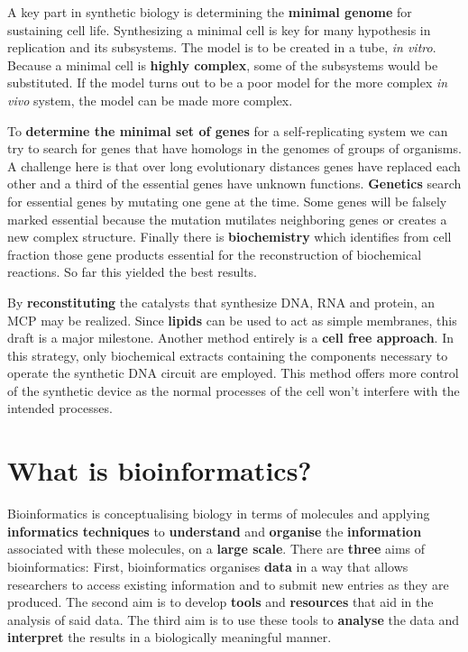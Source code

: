 \documentclass[10pt,a4paper]{report}
\begin{document}
	A key part in synthetic biology is determining the \textbf{minimal genome} for sustaining cell life. 
	Synthesizing a minimal cell is key for many hypothesis in replication and its subsystems. 
	The model is to be created in a tube, \textit{in vitro}. 
	Because a minimal cell is \textbf{highly complex}, some of the subsystems would be substituted. 
	If the model turns out to be a poor model for the more complex \textit{in vivo} system,  the model can be made more complex.
	
	To \textbf{determine the minimal set of genes} for a self-replicating system we can try to search for genes that have homologs in the genomes of groups of organisms. 
	A challenge here is that over long evolutionary distances genes have replaced each other and a third of the essential genes have unknown functions. 
	\textbf{Genetics} search for essential genes by mutating one gene at the time. 
	Some genes will be falsely marked essential because the mutation mutilates neighboring genes or creates a new complex structure.
	Finally there is \textbf{biochemistry} which identifies from cell fraction those gene products essential for the reconstruction of biochemical reactions. 
	So far this yielded the best results.
	
	By \textbf{reconstituting} the catalysts that synthesize DNA, RNA and protein, an MCP may be realized. 
	Since \textbf{lipids} can be used to act as simple membranes, this draft is a major milestone.
	Another method entirely is a \textbf{cell free approach}. 
	In this strategy, only biochemical extracts containing the components necessary to operate the synthetic DNA circuit are employed. 
	This method offers more control of the synthetic device as the normal processes of the cell won’t interfere with the intended processes.
	
	\newpage
	\section{What is bioinformatics?}
	
	Bioinformatics is conceptualising biology in terms of molecules and applying \textbf{informatics techniques} to \textbf{understand} and \textbf{organise} the \textbf{information} associated with these molecules, on a \textbf{large scale}. There are \textbf{three} aims of bioinformatics: First, bioinformatics organises \textbf{data} in a way that allows researchers to access existing information and to submit new entries as they are produced. The second aim is to develop \textbf{tools} and \textbf{resources} that aid in the analysis of said data. The third aim is to use these tools to \textbf{analyse} the data and \textbf{interpret} the results in a biologically meaningful manner.
	
\end{document}
